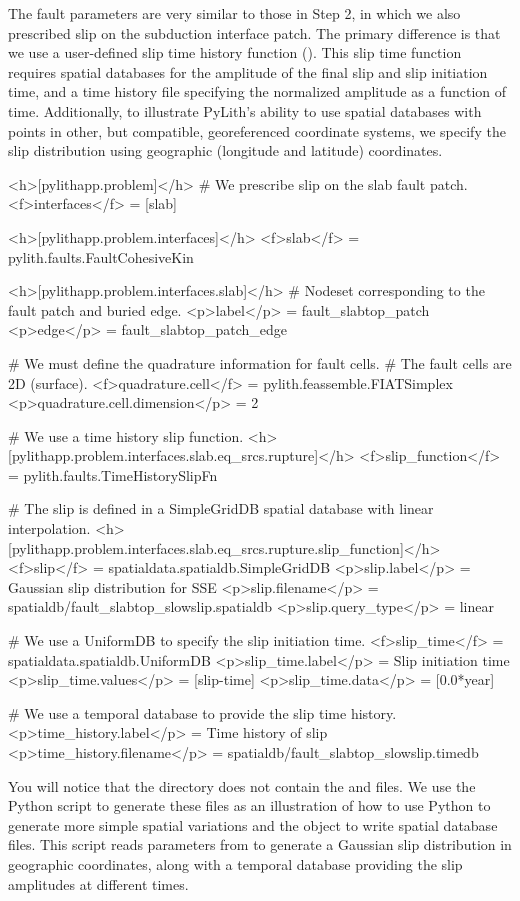 The fault parameters are very similar to those in Step 2, in which we
also prescribed slip on the subduction interface patch. The primary
difference is that we use a user-defined slip time history function
(). This slip time function requires spatial
databases for the amplitude of the final slip and slip initiation
time, and a time history file specifying the normalized amplitude as a
function of time. Additionally, to illustrate PyLith's ability to use
spatial databases with points in other, but compatible, georeferenced
coordinate systems, we specify the slip distribution using geographic
(longitude and latitude) coordinates.
\begin{cfg}
<h>[pylithapp.problem]</h>
# We prescribe slip on the slab fault patch.
<f>interfaces</f> = [slab]

<h>[pylithapp.problem.interfaces]</h>
<f>slab</f> = pylith.faults.FaultCohesiveKin

<h>[pylithapp.problem.interfaces.slab]</h>
# Nodeset corresponding to the fault patch and buried edge.
<p>label</p> = fault_slabtop_patch
<p>edge</p> = fault_slabtop_patch_edge

# We must define the quadrature information for fault cells.
# The fault cells are 2D (surface).
<f>quadrature.cell</f> = pylith.feassemble.FIATSimplex
<p>quadrature.cell.dimension</p> = 2

# We use a time history slip function.
<h>[pylithapp.problem.interfaces.slab.eq_srcs.rupture]</h>
<f>slip_function</f> = pylith.faults.TimeHistorySlipFn

# The slip is defined in a SimpleGridDB spatial database with linear interpolation.
<h>[pylithapp.problem.interfaces.slab.eq_srcs.rupture.slip_function]</h>
<f>slip</f> = spatialdata.spatialdb.SimpleGridDB
<p>slip.label</p> = Gaussian slip distribution for SSE
<p>slip.filename</p> = spatialdb/fault_slabtop_slowslip.spatialdb
<p>slip.query_type</p> = linear

# We use a UniformDB to specify the slip initiation time.
<f>slip_time</f> = spatialdata.spatialdb.UniformDB
<p>slip_time.label</p> = Slip initiation time
<p>slip_time.values</p> = [slip-time]
<p>slip_time.data</p> = [0.0*year] 

# We use a temporal database to provide the slip time history.
<p>time_history.label</p> = Time history of slip
<p>time_history.filename</p> = spatialdb/fault_slabtop_slowslip.timedb
\end{cfg}

You will notice that the  directory does not
contain the  and
 files. We use the
 Python script to generate these files
as an illustration of how to use Python to generate more simple
spatial variations and the  object to write
spatial database files. This script reads parameters from
 to generate a Gaussian slip
distribution in geographic coordinates, along with a temporal database
providing the slip amplitudes at different times.


